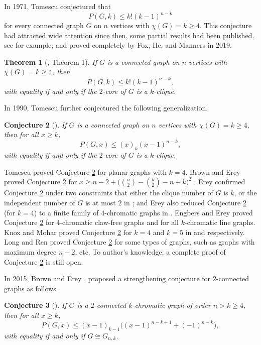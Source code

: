 \documentclass[12pt]{article}
\newtheorem{theorem}{Theorem}[section]
\newtheorem{conjecture}[theorem]{Conjecture}
\theoremstyle{definition}
\begin{document}
In 1971, Tomescu \cite{Tomescu71} conjectured that
$$P(G,k)\leq k!(k-1)^{n-k}$$
for every connected graph $G$ on $n$ vertices with $\chi(G)=k\geq 4$.
This conjecture had attracted wide attention since then, some partial results had been published, see \cite{BE15, Erey181, Erey18, KM20, KM19} for example; and  proved completely by Fox, He, and Manners \cite{FHM19} in 2019.

\begin{theorem}[\cite{FHM19}, Theorem 1] If $G$ is a connected graph on $n$ vertices with $\chi(G)=k\geq 4$, then
$$P(G,k)\leq k!(k-1)^{n-k},$$
with equality if and only if the $2$-core of $G$ is a $k$-clique.
\end{theorem}

In 1990, Tomescu \cite{Tomescu90} further conjectured the following generalization.

\begin{conjecture}[\cite{Tomescu90}]\label{con0} If $G$ is a connected graph on $n$ vertices with $\chi(G)=k\geq 4$, then for all $x\geq k$,
$$P(G,x)\leq (x)_k(x-1)^{n-k},$$ with equality if and only if the $2$-core of $G$ is a $k$-clique.
\end{conjecture}

Tomescu \cite{Tomescu90} proved Conjecture \ref{con0} for planar graphs with $k=4$. Brown and Erey \cite{BE15} proved Conjecture \ref{con0} for $x\geq n-2+\Big(\binom{n}{2}-\binom{k}{2}-n+k\Big)^2$ . Erey confirmed Conjecture \ref{con0} under two constraints that either the clique number of $G$ is $k$, or the independent number of $G$ is at most $2$ in  \cite{Erey18}; and Erey also reduced Conjecture \ref{con0} (for $k=4$) to a finite family of $4$-chromatic graphs in \cite{Erey181}. Engbers and Erey \cite {EE18} proved Conjecture \ref{con0} for $4$-chromatic claw-free graphs and for all $k$-chromatic line graphs. Knox and Mohar proved Conjecture \ref{con0} for $k=4$ and $k=5$ in \cite{KM20} and \cite{KM19} respectively. Long and Ren \cite{LR23} proved Conjecture \ref{con0} for some types of graphs, such as graphs with maximum degree $n-2$, etc. To author's knowledge, a complete proof of Conjecture \ref{con0} is still open.

In 2015, Brown and Erey \cite{BE15}, proposed a strengthening conjecture for $2$-connected graphs as follows.

\begin{conjecture}[\cite{BE15}]\label{con1} If $G$ is a $2$-connected $k$-chromatic graph of order $n>k\geq4$, then for all $x\geq k$,
$$P(G,x)\leq (x-1)_{k-1}\big((x-1)^{n-k+1}+(-1)^{n-k}\big),$$ with equality if and only if $G\cong G_{n,k}$.
\end{conjecture}
\end{document}
